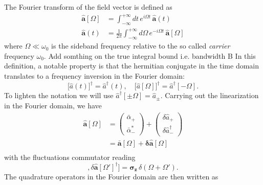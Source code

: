 The Fourier transform of the field vector is defined as
\begin{equation}
  \begin{split}
    \mathbf{\hat{a}}[\Omega] &=\int_{-\infty}^{+\infty}  dt \, e^{i\Omega t} \, \mathbf{\hat{a}}(t)\\
\mathbf{\hat{a}}(t) &= \frac{1}{2\pi}\int_{-\infty}^{+\infty}  d\Omega \, e^{-i\Omega t} \, \mathbf{\hat{a}}[\Omega]
  \end{split}
\end{equation}
where $\Omega \ll \omega_0$ is the sideband frequency relative to the so called \textit{carrier} frequency $\omega_0$. \color{red}  Add somthing on the true integral bound i.e. bandwidth B  \color{black}In this definition, a notable property is that the hermitian conjugate in the time domain translates to a frequency inversion in the Fourier domain:
\begin{equation}
   \Big[\hat{a}(t)\Big]^{\dagger} = \hat{a}^\dagger(t),  \quad
   \Big[\hat{a}[\Omega]\Big]^{\dagger}  = \hat{a}^\dagger[-\Omega].
\end{equation}
To lighten the notation we will use $\hat{a}^\dagger[\pm\Omega]=\hat{a}_\pm$. Carrying out the linearization in the Fourier domain, we have
\begin{equation}
  \begin{split}
      \mathbf{\hat{a}}[\Omega] &=\begin{pmatrix} \bar{\alpha}_+ \\ \bar{\alpha}^*_- \end{pmatrix} + \begin{pmatrix} \delta\hat{a}_+ \\ \delta\hat{a}^\dagger_- \end{pmatrix} \\
      & = \mathbf{\bar{a}}[\Omega]+ \mathbf{\delta \hat{a}}[\Omega]\\
  \end{split}
\end{equation}
with the fluctuations commutator reading
\begin{equation}
  [\delta \mathbf{\hat{a}}[\Omega], \delta \mathbf{\hat{a}}[\Omega']^{\dagger}] = \mathbf{\sigma_z} \, \delta(\Omega + \Omega').
\end{equation}
The quadrature operators in the Fourier domain are then written as 
